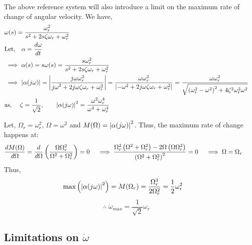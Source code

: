The above reference system will also introduce a limit on the maximum rate of
change of angular velocity. We have,
\begin{align*}
    &\omega(s) = \frac{\omega_{r}^2}{s^2 + 2 s \zeta \omega_{r} + \omega_{r}^2}\\
    &\text{Let,} \quad \alpha = \frac{d \omega }{dt}
    \\
    &\implies \alpha(s) = s \omega(s) =  \frac{s\omega_{r}^2}{s^2 + 2 s \zeta \omega_{r} + \omega_{r}^2}
    \\
    &\implies \left\lvert \alpha(j\omega) \right\rvert = \left\lvert \frac{j \omega \omega_{r}^2}{{j \omega}^2 + 2 j \omega  \zeta \omega_{r} + \omega_{r}^2} \right\rvert
    = \frac{\omega \omega_r^2}{\left\lvert -\omega^2 + 2 j \omega  \zeta \omega_{r} + \omega_{r}^2 \right\rvert}
    = \frac{\omega \omega_r^2}{\sqrt{\left( \omega_r^2 - \omega^2 \right)^2 + 4 \zeta^2 \omega_r^2 \omega^2}}
    \\
    &\text{as, }\quad \zeta = \frac{1}{\sqrt{2}},
    \qquad
    \left\lvert \alpha(j \omega) \right\rvert^2 = \frac{\omega^2 \omega_r^4}{\omega^4 + \omega_r^4}
\end{align*}

Let, $\Omega_r = \omega_r^2$, $\Omega = \omega^2$ and $M(\Omega) =
\left\lvert \alpha(j\omega) \right\rvert^2$.
Thus, the maximum rate of change happens at:
\begin{align*}
    &\frac{d M(\Omega)}{d \Omega} = \frac{d}{d \Omega} \left( \frac{\Omega \Omega_r^2}{\Omega^2 + \Omega_r^2} \right) = 0
    \quad
    \implies \frac{\Omega_r^2 \left( \Omega^2 + \Omega_r^2 \right) - 2 \Omega \left( \Omega \Omega_r^2 \right)}{\left( \Omega^2 + \Omega_r^2 \right)^2} = 0
    \quad
    \implies \Omega = \Omega_r
\end{align*}
Thus,
\begin{align*}
    \max \left( { \left\lvert \alpha(j \omega) \right\rvert^2 } \right) &= M(\Omega_r) = \frac{\Omega_r^3}{2 \Omega_r^2} = \frac{1}{2} \omega_r^2
\end{align*}
\begin{equation}\label{eqn::max_bandwidth}
    \therefore \; \dot \omega_{max} = \frac{1}{\sqrt{2}} \omega_r
\end{equation}


\subsection{Limitations on $\dot \omega$}

